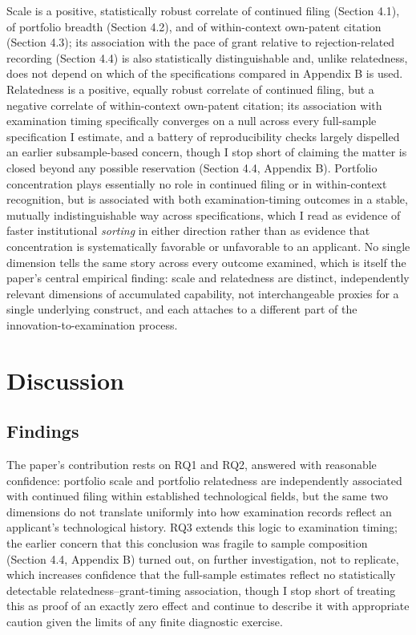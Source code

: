 \documentclass[12pt]{article}
\begin{document}
Scale is a positive, statistically robust correlate of continued filing (Section 4.1), of portfolio breadth (Section 4.2), and of within-context own-patent citation (Section 4.3); its association with the pace of grant relative to rejection-related recording (Section 4.4) is also statistically distinguishable and, unlike relatedness, does not depend on which of the specifications compared in Appendix B is used. Relatedness is a positive, equally robust correlate of continued filing, but a negative correlate of within-context own-patent citation; its association with examination timing specifically converges on a null across every full-sample specification I estimate, and a battery of reproducibility checks largely dispelled an earlier subsample-based concern, though I stop short of claiming the matter is closed beyond any possible reservation (Section 4.4, Appendix B). Portfolio concentration plays essentially no role in continued filing or in within-context recognition, but is associated with both examination-timing outcomes in a stable, mutually indistinguishable way across specifications, which I read as evidence of faster institutional \emph{sorting} in either direction rather than as evidence that concentration is systematically favorable or unfavorable to an applicant. No single dimension tells the same story across every outcome examined, which is itself the paper's central empirical finding: scale and relatedness are distinct, independently relevant dimensions of accumulated capability, not interchangeable proxies for a single underlying construct, and each attaches to a different part of the innovation-to-examination process.

\section{Discussion}

\subsection{Findings}

The paper's contribution rests on RQ1 and RQ2, answered with reasonable confidence: portfolio scale and portfolio relatedness are independently associated with continued filing within established technological fields, but the same two dimensions do not translate uniformly into how examination records reflect an applicant's technological history. RQ3 extends this logic to examination timing; the earlier concern that this conclusion was fragile to sample composition (Section 4.4, Appendix B) turned out, on further investigation, not to replicate, which increases confidence that the full-sample estimates reflect no statistically detectable relatedness--grant-timing association, though I stop short of treating this as proof of an exactly zero effect and continue to describe it with appropriate caution given the limits of any finite diagnostic exercise.
\end{document}
